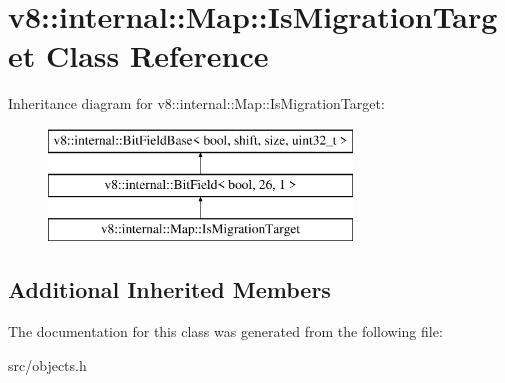 \hypertarget{classv8_1_1internal_1_1_map_1_1_is_migration_target}{}\section{v8\+:\+:internal\+:\+:Map\+:\+:Is\+Migration\+Target Class Reference}
\label{classv8_1_1internal_1_1_map_1_1_is_migration_target}
Inheritance diagram for v8\+:\+:internal\+:\+:Map\+:\+:Is\+Migration\+Target\+:\begin{figure}[H]
\begin{center}
\leavevmode
\includegraphics[height=3.000000cm]{classv8_1_1internal_1_1_map_1_1_is_migration_target}
\end{center}
\end{figure}
\subsection*{Additional Inherited Members}


The documentation for this class was generated from the following file\+:\begin{DoxyCompactItemize}
\item 
src/objects.\+h\end{DoxyCompactItemize}
